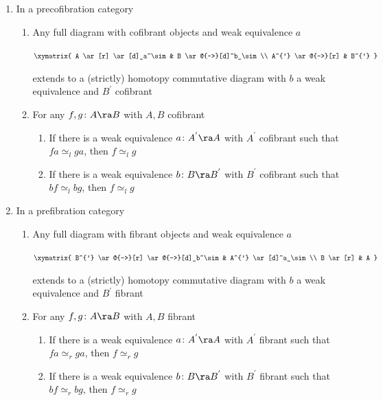 \begin{thm}
\label{thm::homotopycalcoffrations}
\mbox{}
\begin{enumerate}
\item
In a precofibration category
\begin{enumerate}
\item
Any full diagram with cofibrant objects and weak equivalence $a$
\begin{center}
$\xymatrix{
  A \ar[r] \ar[d]_a^\sim & B \ar@{-->}[d]^b_\sim \\
  A^{'} \ar@{-->}[r] & B^{'}
}$
\end{center}
extends to a (strictly) homotopy commutative diagram with $b$ a weak equivalence and $B^{'}$ cofibrant
\item
For any $f,g \colon A \ra B$ with $A, B$ cofibrant
\begin{enumerate}
\item
If there is a weak equivalence $a \colon A^{'} \ra A$ with $A^{'}$ cofibrant such that $fa \simeq_l ga$, then $f \simeq_l g$
\item
If there is a weak equivalence $b \colon B \ra B^{'}$ with $B^{'}$ cofibrant such that $bf \simeq_l bg$, then $f \simeq_l g$
\end{enumerate}
\end{enumerate}
\item
In a prefibration category
\begin{enumerate}
\item
Any full diagram with fibrant objects and weak equivalence $a$
\begin{center}
$\xymatrix{
  B^{'} \ar@{-->}[r] \ar@{-->}[d]_b^\sim & A^{'} \ar[d]^a_\sim  \\
  B \ar[r] & A
}$
\end{center}
extends to a (strictly) homotopy commutative diagram with $b$ a weak equivalence and $B^{'}$ fibrant
\item
For any $f,g \colon A \ra B$ with $A, B$ fibrant
\begin{enumerate}
\item
If there is a weak equivalence $a \colon A^{'} \ra A$ with $A^{'}$ fibrant such that $fa \simeq_r ga$, then $f \simeq_r g$
\item
If there is a weak equivalence $b \colon B \ra B^{'}$ with $B^{'}$ fibrant such that $bf \simeq_r bg$, then $f \simeq_r g$
\end{enumerate}
\end{enumerate}
\end{enumerate}
\end{thm}

